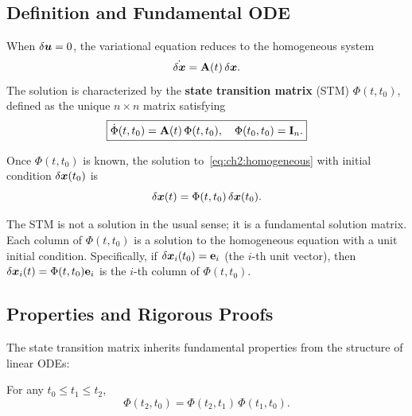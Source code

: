 \subsection{Definition and Fundamental ODE}

When $\delta\bm{u} = 0$, the variational equation reduces to the homogeneous system
\begin{equation}
\dot{\delta\bm{x}} = \mathbf{A}(t)\,\delta\bm{x}.
\label{eq:ch2:homogeneous}
\end{equation}
The solution is characterized by the \textbf{state transition matrix} (STM) $\Phi(t,t_0)$,
defined as the unique $n\times n$ matrix satisfying
\begin{equation}
\boxed{
\dot\Phi(t,t_0) = \mathbf{A}(t)\,\Phi(t,t_0), \quad \Phi(t_0,t_0) = \mathbf{I}_n.
}
\label{eq:ch2:stm-ode}
\end{equation}

Once $\Phi(t,t_0)$ is known, the solution to~\eqref{eq:ch2:homogeneous} with initial condition
$\delta\bm{x}(t_0)$ is
\begin{equation}
\delta\bm{x}(t) = \Phi(t,t_0)\,\delta\bm{x}(t_0).
\label{eq:ch2:stm-solution}
\end{equation}

\begin{remark}
The STM is not a solution in the usual sense; it is a fundamental solution matrix. Each column
of $\Phi(t,t_0)$ is a solution to the homogeneous equation with a unit initial condition.
Specifically, if $\delta\bm{x}_i(t_0) = \mathbf{e}_i$ (the $i$-th unit vector), then $\delta\bm{x}_i(t) = \Phi(t,t_0)\mathbf{e}_i$
is the $i$-th column of $\Phi(t,t_0)$.
\end{remark}

\subsection{Properties and Rigorous Proofs}

The state transition matrix inherits fundamental properties from the structure of linear ODEs:

\begin{theorem}
\label{thm:ch2:semigroup}
For any $t_0 \leq t_1 \leq t_2$,
\begin{equation}
\Phi(t_2,t_0) = \Phi(t_2,t_1)\,\Phi(t_1,t_0).
\label{eq:ch2:semigroup}
\end{equation}
\end{theorem}

